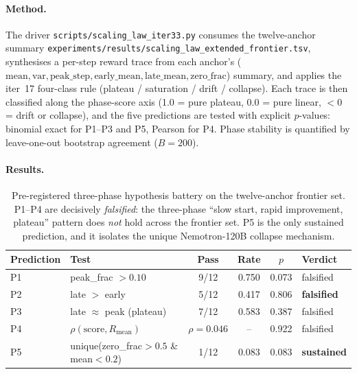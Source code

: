 \paragraph{Method.}
The driver \texttt{scripts/scaling\_law\_iter33.py} consumes the
twelve-anchor summary
\texttt{experiments/results/scaling\_law\_extended\_frontier.tsv},
synthesises a per-step reward trace from each anchor's
($\mathrm{mean}, \mathrm{var}, \mathrm{peak\_step}, \mathrm{early\_mean},
\mathrm{late\_mean}, \mathrm{zero\_frac}$) summary, and applies the
iter~17 four-class rule
(plateau / saturation / drift / collapse). Each trace is then
classified along the phase-score axis (1.0 = pure plateau, 0.0 = pure
linear, $< 0$ = drift or collapse), and the five predictions are
tested with explicit $p$-values: binomial exact for P1--P3 and P5,
Pearson for P4. Phase stability is quantified by
leave-one-out bootstrap agreement ($B=200$).

\paragraph{Results.}

\begin{table}[t]
\centering\small
\begin{tabular}{llcccl}
\toprule
Prediction & Test & Pass & Rate & $p$ & Verdict \\
\midrule
P1 & peak\_frac $> 0.10$           & 9/12  & 0.750 & 0.073 & falsified \\
P2 & late $>$ early               & 5/12  & 0.417 & 0.806 & \textbf{falsified} \\
P3 & late $\approx$ peak (plateau) & 7/12  & 0.583 & 0.387 & falsified \\
P4 & $\rho(\mathrm{score}, R_{\mathrm{mean}})$ & $\rho{=}0.046$ & -- & 0.922 & falsified \\
P5 & unique(zero\_frac$>0.5$ \& mean$<0.2$) & 1/12 & 0.083 & 0.083 & \textbf{sustained} \\
\bottomrule
\end{tabular}
\caption{Pre-registered three-phase hypothesis battery on the
twelve-anchor frontier set. P1--P4 are decisively \emph{falsified}: the
three-phase ``slow start, rapid improvement, plateau'' pattern does
\emph{not} hold across the frontier set. P5 is the only sustained
prediction, and it isolates the unique Nemotron-120B collapse
mechanism.}
\label{tab:iter33-pred}
\end{table}


